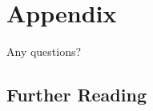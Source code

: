 
\lyxframeend{}\section*{}


\lyxframeend{}\section*{Appendix}


\lyxframeend{}

\begin{center}
{\LARGE Any questions?}
\par\end{center}{\LARGE \par}


\lyxframeend{}


\lyxframeend{}\subsection*{Further Reading}


\lyxframeend{}






\lyxframeend{}
